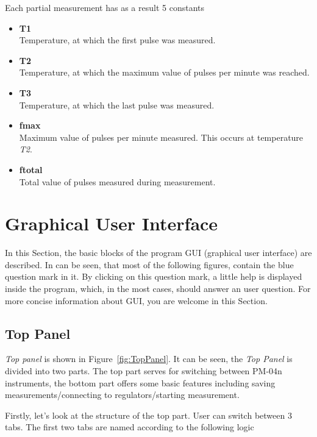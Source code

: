 \documentclass[a4paper,11pt,oneside]{report}
\theoremstyle{named}
\begin{document}
Each partial measurement has as a result 5 constants

\begin{itemize}
  \item \textbf{T1} \\
    Temperature, at which the first pulse was measured.
  \item \textbf{T2} \\
    Temperature, at which the maximum value of pulses per minute was reached.
  \item \textbf{T3} \\
    Temperature, at which the last pulse was measured.
  \item \textbf{fmax} \\
    Maximum value of pulses per minute measured. This occurs at temperature
    \textit{T2}.
  \item \textbf{ftotal} \\
    Total value of pulses measured during measurement. 
\end{itemize}

\section{Graphical User Interface}

In this Section, the basic blocks of the program GUI (graphical user interface)
are described. In can be seen, that most of the following figures, contain the
blue question mark in it. By clicking on this question mark, a little help is
displayed inside the program, which, in the most cases, should answer an user
question. For more concise information about GUI, you are welcome in this
Section. 

\subsection{Top Panel}
\label{sec:TopPanel}

\textit{Top panel} is shown in Figure~\ref{fig:TopPanel}. It can be seen, the
\textit{Top Panel} is divided into two parts. The top part serves for switching
between PM-04n instruments, the bottom part offers some basic features including
saving measurements/connecting to regulators/starting measurement.

Firstly, let's look at the structure of the top part. User can switch between 3
tabs. The first two tabs are named according to the following logic
\end{document}
